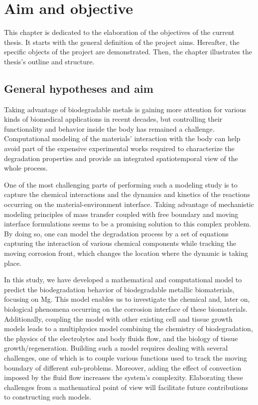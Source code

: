 \chapter{Aim and objective}\label{ch:objective}

This chapter is dedicated to the elaboration of the objectives of the current thesis. It starts with the general definition of the project aims. Hereafter, the specific objects of the project are demonstrated. Then, the chapter illustrates the thesis's outline and structure.


\section{General hypotheses and aim}


Taking advantage of biodegradable metals is gaining more attention for various kinds of biomedical applications in recent decades, but controlling their functionality and behavior inside the body has remained a challenge. Computational modeling of the materials' interaction with the body can help avoid part of the expensive experimental works required to characterize the degradation properties and provide an integrated spatiotemporal view of the whole process.

One of the most challenging parts of performing such a modeling study is to capture the chemical interactions and the dynamics and kinetics of the reactions occurring on the material-environment interface. Taking advantage of mechanistic modeling principles of mass transfer coupled with free boundary and moving interface formulations seems to be a promising solution to this complex problem. By doing so, one can model the degradation process by a set of equations capturing the interaction of various chemical components while tracking the moving corrosion front, which changes the location where the dynamic is taking place.

In this study, we have developed a mathematical and computational model to predict the biodegradation behavior of biodegradable metallic biomaterials, focusing on Mg. This model enables us to investigate the chemical and, later on, biological phenomena occurring on the corrosion interface of these biomaterials. Additionally, coupling the model with other existing cell and tissue growth models leads to a multiphysics model combining the chemistry of biodegradation, the physics of the electrolytes and body fluids flow, and the biology of tissue growth/regeneration. Building such a model requires dealing with several challenges, one of which is to couple various functions used to track the moving boundary of different sub-problems. Moreover, adding the effect of convection imposed by the fluid flow increases the system's complexity. Elaborating these challenges from a mathematical point of view will facilitate future contributions to constructing such models. 


